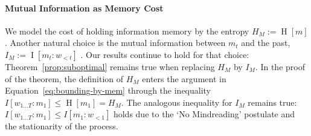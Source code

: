 \documentclass[11pt,letterpaper]{article}
\newcommand\mhahn[1]{{\color{red}(#1)}}
\newcommand\revision[1]{{\color{blue}#1}}
\newcounter{theorem}
\begin{document}
\paragraph{Mutual Information as Memory Cost}
\revision{We model the cost of holding information memory by the entropy $H_M := \operatorname{H}[m]$.
Another natural choice is the mutual information between $m_t$ and the past, $I_M := \operatorname{I}[m_t : w_{<t}]$ \citep{still-information-2014}.
Our results continue to hold for that choice: Theorem~\ref{prop:suboptimal} remains true when replacing $H_M$ by $I_M$.
In the proof of the theorem, the definition of $H_M$ enters the argument in Equation~\ref{eq:bounding-by-mem} through the inequality $I[w_{1\dots T}:m_1] \leq \operatorname{H}[m_1] = H_M$.
The analogous inequality for $I_M$ remains true: $I[w_{1\dots T}:m_1] \leq I[m_{1} : w_{<1}]$ holds due to the `No Mindreading' postulate and the stationarity of the process.}



\end{document}
